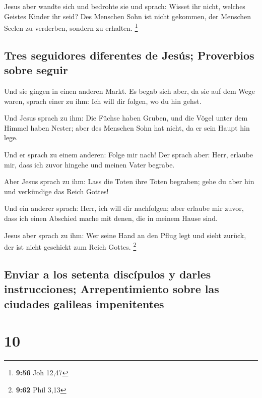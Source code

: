  Jesus aber wandte sich und bedrohte sie und sprach:
Wisset ihr nicht, welches Geistes Kinder ihr seid?  Des
Menschen Sohn ist nicht gekommen, der Menschen Seelen zu verderben,
sondern zu erhalten. \footnote{\textbf{9:56} Joh 12,47}

\hypertarget{tres-seguidores-diferentes-de-jesuxfas-proverbios-sobre-seguir}{%
\subsection{Tres seguidores diferentes de Jesús; Proverbios sobre
seguir}\label{tres-seguidores-diferentes-de-jesuxfas-proverbios-sobre-seguir}}

 Und sie gingen in einen anderen Markt. Es begab sich
aber, da sie auf dem Wege waren, sprach einer zu ihm: Ich will dir
folgen, wo du hin gehst.

 Und Jesus sprach zu ihm: Die Füchse haben Gruben, und
die Vögel unter dem Himmel haben Nester; aber des Menschen Sohn hat
nicht, da er sein Haupt hin lege.

 Und er sprach zu einem anderen: Folge mir nach! Der
sprach aber: Herr, erlaube mir, dass ich zuvor hingehe und meinen Vater
begrabe.

 Aber Jesus sprach zu ihm: Lass die Toten ihre Toten
begraben; gehe du aber hin und verkündige das Reich Gottes!

 Und ein anderer sprach: Herr, ich will dir nachfolgen;
aber erlaube mir zuvor, dass ich einen Abschied mache mit denen, die in
meinem Hause sind.

 Jesus aber sprach zu ihm: Wer seine Hand an den Pflug
legt und sieht zurück, der ist nicht geschickt zum Reich Gottes.
\footnote{\textbf{9:62} Phil 3,13}

\hypertarget{enviar-a-los-setenta-discuxedpulos-y-darles-instrucciones-arrepentimiento-sobre-las-ciudades-galileas-impenitentes}{%
\subsection{Enviar a los setenta discípulos y darles instrucciones;
Arrepentimiento sobre las ciudades galileas
impenitentes}\label{enviar-a-los-setenta-discuxedpulos-y-darles-instrucciones-arrepentimiento-sobre-las-ciudades-galileas-impenitentes}}

\hypertarget{section-9}{%
\section{10}\label{section-9}}

